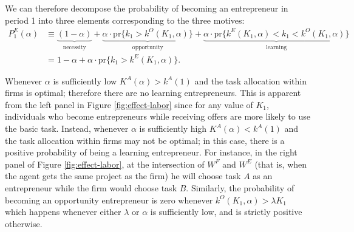 \documentclass[12pt,american]{paper}
\theoremstyle{remark}
\begin{document}
We can therefore decompose the probability of becoming an entrepreneur in period 1 into three elements corresponding to the three motives:  
\begin{align*}
P_1^E(\alpha)&\equiv \underbrace{(1-\alpha)}_{\mbox{necessity}} + \underbrace{\alpha  \cdot \mbox{pr}\{k_1>k^O(K_1,\alpha) \}}_{\mbox{opportunity}}  + 
\underbrace{\alpha \cdot \mbox{pr} \{k^E(K_1,\alpha) < k_1<k^O(K_1, \alpha)\}}_{\mbox{learning}} \\
&=1-\alpha+\alpha \cdot\mbox{pr}\{k_1>k^E(K_1,\alpha) \}.
\end{align*}


Whenever $\alpha$ is sufficiently low $K^A(\alpha)> k^A(1)$ and the task allocation within firms is optimal; therefore there are no learning entrepreneurs. This is apparent from the left panel in Figure \ref{fig:effect-labor} since for any value of $K_1$, individuals who become entrepreneurs while receiving offers are more likely to use the basic task. Instead, whenever $\alpha$ is sufficiently high $K^A(\alpha) < k^A(1)$ and  the task allocation within firms may not be optimal; in this case, there is a positive probability of being a learning entrepreneur. For instance, in the right panel of Figure \ref{fig:effect-labor}, at the intersection of $W^F$ and $W^E$ (that is, when the agent gets the same project as the firm) he will choose task $A$ as an entrepreneur while the firm would choose task $B$.  %
Similarly, the probability of becoming an opportunity entrepreneur is zero whenever $k^O (K_1,\alpha) > \lambda K_1$ which happens whenever either $\lambda$ or $\alpha$ is sufficiently low, and is strictly positive otherwise. 
\end{document}
